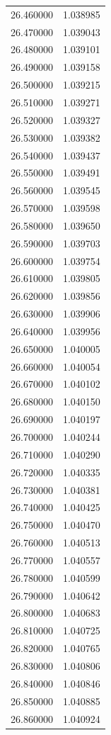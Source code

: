 \begin{tabular}{rr}
26.460000 & 1.038985 \\
26.470000 & 1.039043 \\
26.480000 & 1.039101 \\
26.490000 & 1.039158 \\
26.500000 & 1.039215 \\
26.510000 & 1.039271 \\
26.520000 & 1.039327 \\
26.530000 & 1.039382 \\
26.540000 & 1.039437 \\
26.550000 & 1.039491 \\
26.560000 & 1.039545 \\
26.570000 & 1.039598 \\
26.580000 & 1.039650 \\
26.590000 & 1.039703 \\
26.600000 & 1.039754 \\
26.610000 & 1.039805 \\
26.620000 & 1.039856 \\
26.630000 & 1.039906 \\
26.640000 & 1.039956 \\
26.650000 & 1.040005 \\
26.660000 & 1.040054 \\
26.670000 & 1.040102 \\
26.680000 & 1.040150 \\
26.690000 & 1.040197 \\
26.700000 & 1.040244 \\
26.710000 & 1.040290 \\
26.720000 & 1.040335 \\
26.730000 & 1.040381 \\
26.740000 & 1.040425 \\
26.750000 & 1.040470 \\
26.760000 & 1.040513 \\
26.770000 & 1.040557 \\
26.780000 & 1.040599 \\
26.790000 & 1.040642 \\
26.800000 & 1.040683 \\
26.810000 & 1.040725 \\
26.820000 & 1.040765 \\
26.830000 & 1.040806 \\
26.840000 & 1.040846 \\
26.850000 & 1.040885 \\
26.860000 & 1.040924 \\

\end{tabular}
